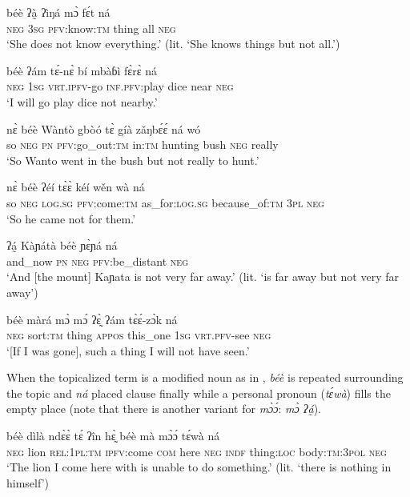 \documentclass[output=paper,colorlinks=true, citecolor=brown]{langscibook}
\begin{document}
\ea\label{ex:gba:75}
    \gll béè ʔà̰   ʔìŋá mɔ̀ fɛ́t ná \\ 
         \textsc{neg} 3\textsc{sg} \textsc{pfv}:know:\textsc{tm} thing all \textsc{neg} \\
    \glt ‘She does not know everything.’ (lit. ‘She knows things but not all.’)
\z 

\ea\label{ex:gba:76}
    \gll béè ʔám tɛ́-nɛ̀ bí mbàɓì fɛ̀rɛ̀ ná \\ 
         \textsc{neg} 1\textsc{sg} \textsc{vrt.ipfv}-go \textsc{inf.pfv}:play dice near \textsc{neg} \\
    \glt ‘I will go play dice not nearby.’
\z 

\ea\label{ex:gba:77}
    \gll nɛ̀ béè Wàntò gbòó tɛ̀ gíà zǎŋbɛ́ɛ́ ná wó \\ 
         so \textsc{neg} \textsc{pn} \textsc{pfv}:go\_out:\textsc{tm} in\textsc{:tm} hunting bush \textsc{neg} really \\
    \glt ‘So Wanto went in the bush but not really to hunt.’
\z 

\ea\label{ex:gba:78}
    \gll nɛ̀ béè ʔéí tɛ̀ɛ̀ kéí wěn wà ná \\ 
         so \textsc{neg} \textsc{log.sg} \textsc{pfv:}come:\textsc{tm} as\_for:\textsc{log.sg} because\_of:\textsc{tm} 3\textsc{pl} \textsc{neg} \\
    \glt ‘So he came not for them.’
\z 

\ea\label{ex:gba:79}
    \gll ʔá̰  Kàɲátà béè ɲɛ̀ɲá ná \\ 
         and\_now \textsc{pn} \textsc{neg} \textsc{pfv}:be\_distant \textsc{neg} \\
    \glt ‘And [the mount] Kaɲata is not very far away.’ (lit. ‘is far away but not very far away’)
\z 

\ea\label{ex:gba:80}
    \gll béè màrá mɔ̀ mɔ́ ʔɛ̰̀ ʔám tɛ̀ɛ́-zɔ̀k ná \\ 
         \textsc{neg} sort:\textsc{tm} thing \textsc{appos} this\_one \textsc{1sg} \textsc{vrt.pfv}-see \textsc{neg} \\
    \glt ‘[If I was gone], such a thing I will not have seen.’
\z 

When the topicalized term is a modified noun as in , \textit{béè} is repeated surrounding the topic and \textit{ná} placed clause finally while a personal pronoun (\textit{tɛ́w\`{a}}) fills the empty place (note that there is another variant for \textit{mɔ̀ɔ́}: \textit{mɔ̀ ʔá̰}).


\ea\label{ex:gba:81}
    \gll béè dìlà ndɛ̀ɛ̀ tɛ́ ʔîn hɛ̰̀ béè mà {mɔ̀ɔ́} tɛ́wà ná \\ 
         \textsc{neg} lion \textsc{rel:1pl:tm} \textsc{ipfv}:come \textsc{com} here \textsc{neg} \textsc{indf} thing:\textsc{loc} body:\textsc{tm:3pol} \textsc{neg} \\
    \glt ‘The lion I come here with is unable to do something.’ (lit. ‘there is nothing in himself’)
\z 
 
\end{document}
